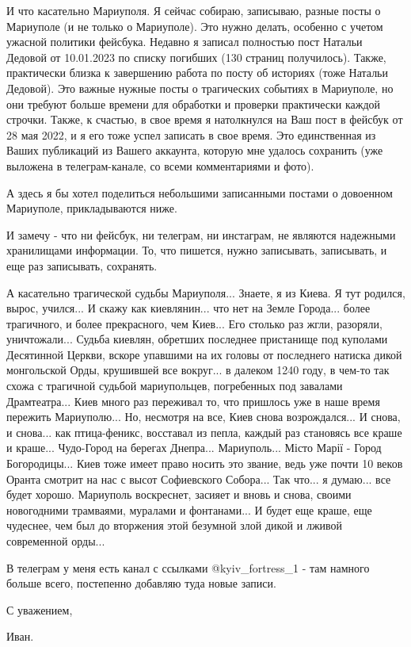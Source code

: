 И что касательно Мариуполя. Я сейчас собираю, записываю, разные посты о
Мариуполе (и не только о Мариуполе). Это нужно делать, особенно с учетом
ужасной политики фейсбука.  Недавно я записал полностью пост Натальи Дедовой от
10.01.2023 по списку погибших (130 страниц получилось). Также, практически
близка к завершению работа по посту об историях (тоже Натальи Дедовой).  Это
важные нужные посты о трагических событиях в Мариуполе, но они требуют больше
времени для обработки и проверки практически каждой строчки. Также, к счастью,
в свое время я натолкнулся на Ваш пост в фейсбук от 28 мая 2022, и я его тоже
успел записать в свое время.  Это единственная из Ваших публикаций из Вашего
аккаунта, которую мне удалось сохранить (уже выложена в телеграм-канале, со
всеми комментариями и фото).

А здесь я бы хотел поделиться небольшими записанными постами о довоенном
Мариуполе, прикладываются ниже.

И замечу - что ни фейсбук, ни телеграм, ни инстаграм, не являются надежными
хранилищами информации.  То, что пишется, нужно записывать, записывать, и еще раз
записывать, сохранять.

А касательно трагической судьбы Мариуполя... Знаете, я из Киева.  Я тут
родился, вырос, учился... И скажу как киевлянин... что нет на Земле Города...
более трагичного, и более прекрасного, чем Киев... Его столько раз жгли,
разоряли, уничтожали...  Судьба киевлян, обретших последнее пристанище под
куполами Десятинной Церкви, вскоре упавшими на их головы от последнего натиска
дикой монгольской Орды, крушившей все вокруг...  в далеком 1240 году, в чем-то
так схожа с трагичной судьбой мариупольцев, погребенных под завалами
Драмтеатра... Киев много раз переживал то, что пришлось уже в наше время
пережить Мариуполю...  Но, несмотря на все, Киев снова возрождался... И снова,
и снова... как птица-феникс, восставал из пепла, каждый раз становясь все краше
и краше... Чудо-Город на берегах Днепра... Мариуполь... Місто Марії - Город
Богородицы... Киев тоже имеет право носить это звание, ведь уже почти 10 веков
Оранта смотрит на нас с высот Софиевского Собора... Так что... я думаю... все
будет хорошо. Мариуполь воскреснет, засияет и вновь и снова, своими новогодними
трамваями, муралами и фонтанами...  И будет еще краше, еще чудеснее, чем был до
вторжения этой безумной злой дикой и лживой современной орды...

В телеграм у меня есть канал с ссылками @kyiv_fortress_1 - там намного больше
всего, постепенно добавляю туда новые записи.

С уважением,

Иван.

